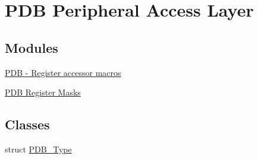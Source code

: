 \hypertarget{group__PDB__Peripheral__Access__Layer}{}\section{P\+DB Peripheral Access Layer}
\label{group__PDB__Peripheral__Access__Layer}
\subsection*{Modules}
\begin{DoxyCompactItemize}
\item 
\hyperlink{group__PDB__Register__Accessor__Macros}{P\+D\+B -\/ Register accessor macros}
\item 
\hyperlink{group__PDB__Register__Masks}{P\+D\+B Register Masks}
\end{DoxyCompactItemize}
\subsection*{Classes}
\begin{DoxyCompactItemize}
\item 
struct \hyperlink{structPDB__Type}{P\+D\+B\+\_\+\+Type}
\end{DoxyCompactItemize}
